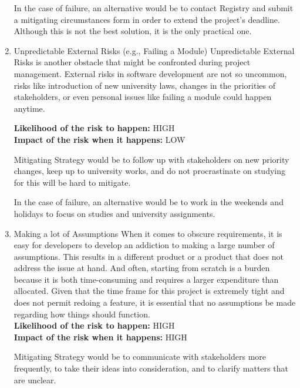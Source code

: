 \begin{justify}
\begin{enumerate}
    \newendline In the case of failure, an alternative would be to contact Registry and submit a mitigating circumstances form in order to extend the project's deadline. Although this is not the best solution, it is the only practical one.\newendline

    \item Unpredictable External Risks (e.g., Failing a Module)
    \newendline Unpredictable External Risks is another obstacle that might be confronted during project management. External risks in software development are not so uncommon, risks like introduction of new university laws, changes in the priorities of stakeholders, or even personal issues like failing a module could happen anytime.

    \newendline \textbf{\textcolor{vin}{Likelihood of the risk to happen:}} HIGH\\
    \textbf{\textcolor{vin}{Impact of the risk when it happens:}} LOW

    \newendline Mitigating Strategy would be to follow up with stakeholders on new priority changes, keep up to university works, and do not procrastinate on studying for this will be hard to mitigate.

    \newendline In the case of failure, an alternative would be to work in the weekends and holidays to focus on studies and university assignments.\newendline


    \item Making a lot of Assumptions
    \newendline When it comes to obscure requirements, it is easy for developers to develop an addiction to making a large number of assumptions. This results in a different product or a product that does not address the issue at hand. And often, starting from scratch is a burden because it is both time-consuming and requires a larger expenditure than allocated. Given that the time frame for this project is extremely tight and does not permit redoing a feature, it is essential that no assumptions be made regarding how things should function.\\

    \newendline \textbf{\textcolor{vin}{Likelihood of the risk to happen:}} HIGH\\
    \textbf{\textcolor{vin}{Impact of the risk when it happens:}} HIGH

    \newendline Mitigating Strategy would be to communicate with stakeholders more frequently, to take their ideas into consideration, and to clarify matters that are unclear.


\end{enumerate}
\end{justify}
